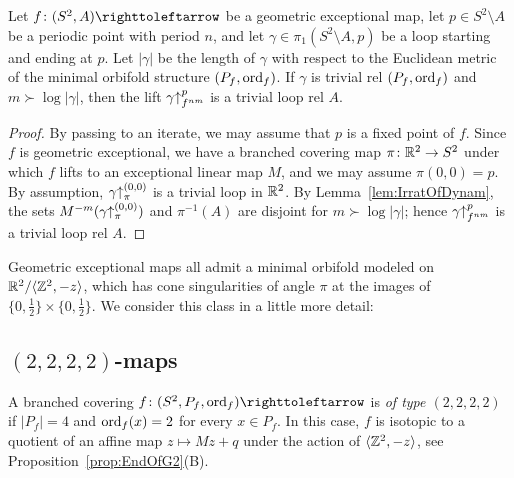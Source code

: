 \documentclass{amsart}
\begin{document}
\begin{cor}\label{lem:IrratOfDynam2}
  Let $f\colon(S^2,A)\selfmap$ be a geometric exceptional map, let
  $p\in S^2\setminus A$ be a periodic point with period $n$, and let
  $\gamma\in\pi_1(S^2\setminus A,p)$ be a loop starting and ending at
  $p$. Let $|\gamma|$ be the length of $\gamma$ with respect to the
  Euclidean metric of the minimal orbifold structure
  $(P_f,\operatorname{ord}_f)$. If $\gamma$ is trivial rel $(P_f,\operatorname{ord}_f)$ and
  $m\succ \log |\gamma|$, then the lift $\gamma {\uparrow}_{f^{n m}}^{p}$ is
  a trivial loop rel $A$.
\end{cor}
\begin{proof}
  By passing to an iterate, we may assume that $p$ is a fixed point of
  $f$.  Since $f$ is geometric exceptional, we have a branched
  covering map $\pi\colon{\mathbb R}^2\to S^2$ under which $f$ lifts to an
  exceptional linear map $M$, and we may assume $\pi(0,0)=p$. By
  assumption, $\gamma{\uparrow}_{\pi}^{(0,0)}$ is a trivial loop in
  ${\mathbb R}^2$. By Lemma~\ref{lem:IrratOfDynam}, the sets
  $M^{-m}(\gamma{\uparrow}_{\pi}^{(0,0)})$ and $\pi^{-1}(A)$ are disjoint
  for $m\succ \log |\gamma|$; hence $\gamma {\uparrow}_{f^{n m}}^{p}$ is
  a trivial loop rel $A$.
\end{proof}

Geometric exceptional maps all admit a minimal orbifold modeled on
${\mathbb R}^2/\langle {\mathbb Z}^2,-z\rangle$, which has cone singularities of angle
$\pi$ at the images of $\{0,\frac12\}\times\{0,\frac12\}$. We consider
this class in a little more detail:
\subsection{\boldmath $(2,2,2,2)$-maps}
A branched covering $f\colon(S^2,P_f,\ord_f)\selfmap$ is \emph{of type
  $(2,2,2,2)$} if $|P_f|=4$ and $\operatorname{ord}_f(x)=2$ for every $x\in P_f$. In
this case, $f$ is isotopic to a quotient of an affine map
$z\mapsto M z+q$ under the action of $\langle{\mathbb Z}^2,-z\rangle$, see
Proposition~\ref{prop:EndOfG2}(B).
\end{document}
